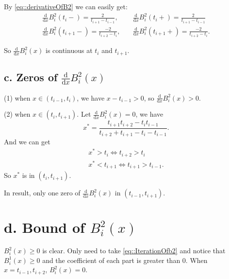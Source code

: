 \documentclass[a4paper]{article}
\begin{document}
By \eqref{eq::derivativeOfB2} we can easily get:
\begin{equation}
    \begin{aligned}
        \frac{\mathrm{d}}{\mathrm{d} x} B_i^2(t_i -) = \frac{2}{t_{i+1} - t_{i-1}},& \quad \frac{\mathrm{d}}{\mathrm{d} x} B_i^2(t_i +) = \frac{2}{t_{i+1} - t_{i-1}} \\
        \frac{\mathrm{d}}{\mathrm{d} x} B_i^2(t_{i+1} -) = \frac{-2}{t_{i+2} - t_{i}},& \quad \frac{\mathrm{d}}{\mathrm{d} x} B_i^2(t_{i+1} +) = \frac{-2}{t_{i+2} - t_{i}}. 
    \end{aligned}
\end{equation}

So $\frac{\mathrm{d}}{\mathrm{d} x} B_i^2(x)$ is continuous at $t_i$ and $t_{i+1}$. 

\subsection*{c. Zeros of $\frac{\mathrm{d}}{\mathrm{d} x} B_i^2(x)$}

(1) when $x \in (t_{i-1}, t_{i})$, we have $x-t_{i-1} > 0$, so $\frac{\mathrm{d}}{\mathrm{d} x} B_i^2(x) > 0$.

(2) when $x \in (t_{i}, t_{i+1})$. Let $\frac{\mathrm{d}}{\mathrm{d} x} B_i^2(x) = 0$, we have
\begin{equation}
    x^* = \frac{t_{i+1} t_{i+2} - t_{i} t_{i-1}}{t_{i+2} + t_{i+1} - t_i - t_{i-1}}. 
\end{equation}
And we can get
\begin{equation}
    \begin{aligned}
        x^* > t_i \Leftrightarrow t_{i+2} > t_i \\
        x^* < t_{i+1} \Leftrightarrow t_{i+1} > t_{i-1}. 
    \end{aligned}
\end{equation}
So $x^*$ is in $(t_i, t_{i+1})$. 

In result, only one zero of $\frac{\mathrm{d}}{\mathrm{d} x} B_i^2(x)$ in $(t_{i-1}, t_{i+1})$.

\section*{d. Bound of $B_i^2(x)$}

$B_i^2(x) \geq 0$ is clear. Only need to take \eqref{eq::IterationOfb2} and notice that $B_i^1(x) \geq 0$ and the coefficient of each part is greater than 0. When $x = t_{i-1}, t_{i+2}$, $B_i^2(x) = 0$. 
\end{document}
